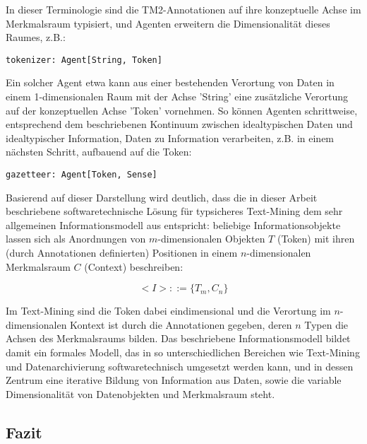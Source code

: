 \documentclass[abstracton, 12pt]{scrartcl}
\begin{document}
In dieser Terminologie sind die TM2-Annotationen auf ihre konzeptuelle Achse im Merkmalsraum typisiert, und Agenten erweitern die Dimensionalität dieses Raumes, z.B.:

\begin{lstlisting}
tokenizer: Agent[String, Token]
\end{lstlisting}

Ein solcher Agent etwa kann aus einer bestehenden Verortung von Daten in einem 1-di\-men\-sion\-alen Raum mit der Achse 'String' eine zusätzliche Verortung auf der konzeptuellen Achse 'Token' vornehmen. So können Agenten schrittweise, entsprechend dem beschriebenen Kontinuum zwischen idealtypischen Daten und idealtypischer Information, Daten zu Information verarbeiten, z.B. in einem nächsten Schritt, aufbauend auf die Token:

\begin{lstlisting}
gazetteer: Agent[Token, Sense]
\end{lstlisting}

Basierend auf dieser Darstellung wird deutlich, dass die in dieser Arbeit beschriebene softwaretechnische Lösung für typsicheres Text-Mining dem sehr allgemeinen Informationsmodell aus \citet[237]{Thaller2009b} entspricht: beliebige Informationsobjekte lassen sich als Anordnungen von $m$-dimensionalen Objekten $T$ (Token) mit ihren (durch Annotationen definierten) Positionen in einem $n$-dimensionalen Merkmalsraum $C$ (Context) beschreiben:

\begin{equation} 
<I> ::= \{ T_m, C_n \}
\end{equation}

Im Text-Mining sind die Token dabei eindimensional und die Verortung im $n$-di\-men\-si\-on\-alen Kontext ist durch die Annotationen gegeben, deren $n$ Typen die Achsen des Merkmalsraums bilden. Das beschriebene Informationsmodell bildet damit ein formales Modell, das in so unterschiedlichen Bereichen wie Text-Mining und Datenarchivierung softwaretechnisch umgesetzt werden kann, und in dessen Zentrum eine iterative Bildung von Information aus Daten, sowie die variable Dimensionalität von Datenobjekten und Merkmalsraum steht.

\subsection{Fazit}
\end{document}

